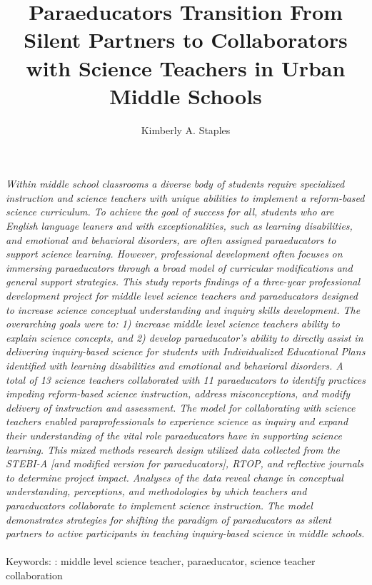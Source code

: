 \documentclass[11.5pt]{sig-alternate} %
\makeatletter
\let\oldabstract\abstract
\let\oldendabstract\endabstract
\renewenvironment{abstract} %
{\renewenvironment{quotation}%
               {\list{}{\addtolength{\leftmargin}{1em} %
                        \listparindent 1.5em%
                        \itemindent    \listparindent%
                        \rightmargin   \leftmargin%
                        \parsep        \z@ \@plus\p@}%
                \item\relax}%
               {\endlist}%
\oldabstract}
{\oldendabstract}
\makeatother
\begin{document}
\title{Paraeducators Transition From Silent Partners to Collaborators with Science Teachers in Urban Middle Schools}

\author[1]{\large \color{blue}Kimberly A. Staples}


\toappear{}
\maketitle
\begin{@twocolumnfalse} 
\begin{abstract}
\item 
\textit{Within middle school classrooms a diverse body of students require specialized instruction and science teachers with unique abilities to implement a reform-based science curriculum. To achieve the goal of success for all, students who are English language leaners and with exceptionalities, such as learning disabilities, and emotional and behavioral disorders, are often assigned paraeducators to support science learning. However, professional development often focuses on immersing paraeducators through a broad model of curricular modifications and general support strategies. This study reports findings of a three-year professional development project for middle level science teachers and paraeducators designed to increase science conceptual understanding and inquiry skills development. The overarching goals were to: 1) increase middle level science teachers ability to explain science concepts, and 2) develop paraeducator’s ability to directly assist in delivering inquiry-based science for students with Individualized Educational Plans identified with learning disabilities and emotional and behavioral disorders. A total of 13 science teachers collaborated with 11 paraeducators to identify practices impeding reform-based science instruction, address misconceptions, and modify delivery of instruction and assessment. The model for collaborating with science teachers enabled paraprofessionals to experience science as inquiry and expand their understanding of the vital role paraeducators have in supporting science learning. This mixed methods research design utilized data collected from the STEBI-A [and modified version for paraeducators], RTOP, and reflective journals to determine project impact. Analyses of the data reveal change in conceptual understanding, perceptions, and methodologies by which teachers and paraeducators collaborate to implement science instruction. The model demonstrates strategies for shifting the paradigm of paraeducators as silent partners to active participants in teaching inquiry-based science in middle schools.}
\\ \\
Keywords: : middle level science teacher, paraeducator, science teacher collaboration
\end{abstract}
\end{@twocolumnfalse}
\end{document}
